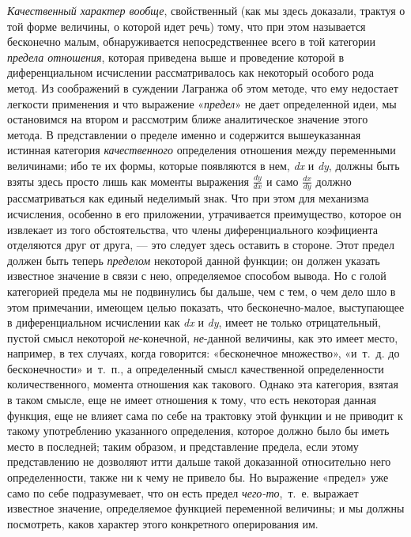 {{\em Качественный характер вообще}, свойственный (как мы
здесь доказали, трактуя о той форме величины, о которой идет речь) тому,
что при этом называется бесконечно малым, обнаруживается непосредственнее
всего в той категории {\em предела отношения}, которая
приведена выше и проведение которой в диференциальном исчислении
рассматривалось как некоторый особого рода метод. Из соображений в суждении
Лагранжа об этом методе, что ему недостает легкости применения и что
выражение «{\em предел}» не дает определенной идеи, мы
остановимся на втором и рассмотрим ближе аналитическое значение этого
метода. В представлении о пределе именно и содержится вышеуказанная
истинная категория {\em качественного} определения
отношения между переменными величинами; ибо те их формы, которые появляются
в нем, {\em dx} и {\em dy}, должны
быть взяты здесь просто лишь как моменты выражения 
$\frac{\mathit{dy}}{\mathit{dx}}$  и само 
$\frac{\mathit{dx}}{\mathit{dy}}$  должно рассматриваться как единый
неделимый знак. Что при этом для механизма исчисления, особенно в его
приложении, утрачивается преимущество, которое он извлекает из того
обстоятельства, что члены диференциального коэфициента отделяются друг от
друга, — это следует здесь оставить в стороне. Этот предел должен быть
теперь {\em пределом} некоторой данной функции; он
должен указать известное значение в связи с нею, определяемое способом
вывода. Но с голой категорией предела мы не подвинулись бы дальше, чем с
тем, о чем дело шло в этом примечании, имеющем целью показать, что
бесконечно-малое, выступающее в диференциальном исчислении как
{\em dx} и {\em dy}, имеет не
только отрицательный, пустой смысл некоторой
{\em не}{}-конечной,
{\em не}{}-данной величины, как это имеет место,
например, в тех случаях, когда говорится: «бесконечное множество», «и~т.~д.
до бесконечности» и~т.~п., а определенный смысл качественной определенности
количественного, момента отношения как такового. Однако эта категория,
взятая в таком смысле, еще не имеет отношения к тому, что есть некоторая
данная функция, еще не влияет сама по себе на трактовку этой функции и не
приводит к такому употреблению указанного определения, которое должно было
бы иметь место в последней; таким образом, и представление предела, если
этому представлению не дозволяют итти дальше такой доказанной относительно
него определенности, также ни к чему не привело бы. Но выражение «предел»
уже само по себе подразумевает, что он есть предел
{\em чего-то},~т.~е. выражает известное значение,
определяемое функцией переменной величины; и мы должны посмотреть, каков
характер этого конкретного оперирования им.

}
